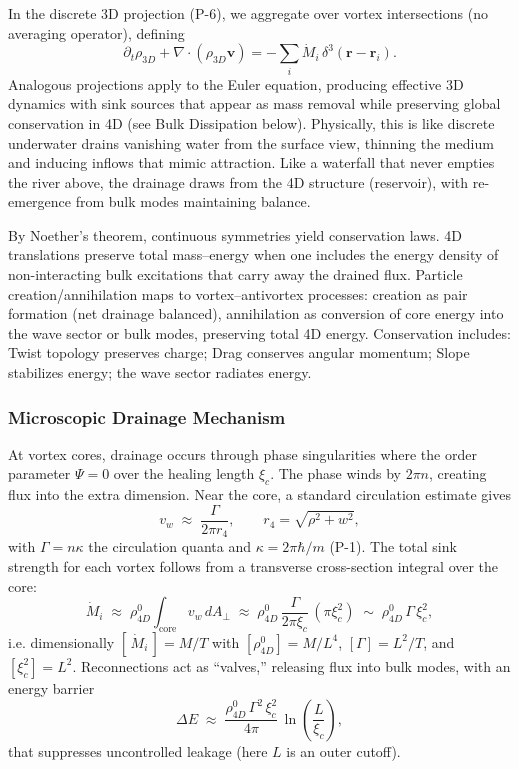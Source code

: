 In the discrete 3D projection (P-6), we aggregate over vortex intersections (no averaging operator), defining
\begin{equation}
\partial_t \rho_{3D} + \nabla \!\cdot (\rho_{3D}\mathbf{v}) = -\sum_i \dot{M}_i\,\delta^3(\mathbf{r}-\mathbf{r}_i).
\end{equation}
Analogous projections apply to the Euler equation, producing effective 3D dynamics with sink sources that appear as mass removal while preserving global conservation in 4D (see Bulk Dissipation below). Physically, this is like discrete underwater drains vanishing water from the surface view, thinning the medium and inducing inflows that mimic attraction. Like a waterfall that never empties the river above, the drainage draws from the 4D structure (reservoir), with re-emergence from bulk modes maintaining balance.

By Noether's theorem, continuous symmetries yield conservation laws. 4D translations preserve total mass–energy when one includes the energy density of non-interacting bulk excitations that carry away the drained flux. Particle creation/annihilation maps to vortex–antivortex processes: creation as pair formation (net drainage balanced), annihilation as conversion of core energy into the wave sector or bulk modes, preserving total 4D energy. Conservation includes: Twist topology preserves charge; Drag conserves angular momentum; Slope stabilizes energy; the wave sector radiates energy.

\subsubsection{Microscopic Drainage Mechanism}
At vortex cores, drainage occurs through phase singularities where the order parameter $\Psi=0$ over the healing length $\xi_c$. The phase winds by $2\pi n$, creating flux into the extra dimension. Near the core, a standard circulation estimate gives
\begin{equation}
v_w \;\approx\; \frac{\Gamma}{2\pi r_4},\qquad r_4=\sqrt{\rho^2+w^2},
\end{equation}
with $\Gamma=n\kappa$ the circulation quanta and $\kappa=2\pi\hbar/m$ (P-1). The total sink strength for each vortex follows from a transverse cross-section integral over the core:
\begin{equation}
\dot M_i \;\approx\; \rho_{4D}^0 \int_{\text{core}} v_w\, dA_\perp 
\;\approx\; \rho_{4D}^0\,\frac{\Gamma}{2\pi \xi_c}\,(\pi \xi_c^2)
\;\sim\; \rho_{4D}^0\,\Gamma\,\xi_c^2,
\end{equation}
i.e. dimensionally $[\,\dot M_i\,]=M/T$ with $[\rho_{4D}^0]=M/L^4$, $[\Gamma]=L^2/T$, and $[\xi_c^2]=L^2$. Reconnections act as ``valves,'' releasing flux into bulk modes, with an energy barrier
\begin{equation}
\Delta E \;\approx\; \frac{\rho_{4D}^0\,\Gamma^2\,\xi_c^2}{4\pi}\,\ln\!\left(\frac{L}{\xi_c}\right),
\end{equation}
that suppresses uncontrolled leakage (here $L$ is an outer cutoff).

